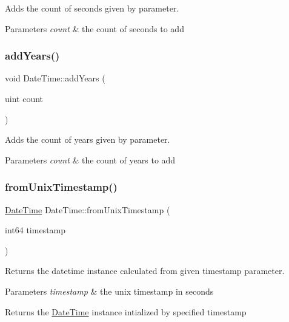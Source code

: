 Adds the count of seconds given by parameter. 


\begin{DoxyParams}{Parameters}
{\em count} & the count of seconds to add \\
\hline
\end{DoxyParams}
\mbox{\label{class_date_time_a831ab5e9d50c8157ee0c23dc292b8ef5}} 
\subsubsection{\texorpdfstring{addYears()}{addYears()}}
{\footnotesize\ttfamily void Date\+Time\+::add\+Years (\begin{DoxyParamCaption}\item[{uint}]{count }\end{DoxyParamCaption})}



Adds the count of years given by parameter. 


\begin{DoxyParams}{Parameters}
{\em count} & the count of years to add \\
\hline
\end{DoxyParams}
\mbox{\label{class_date_time_afdc41a37a33bc6c5643430494f959c1b}} 
\subsubsection{\texorpdfstring{fromUnixTimestamp()}{fromUnixTimestamp()}}
{\footnotesize\ttfamily \mbox{\hyperlink{class_date_time}{Date\+Time}} Date\+Time\+::from\+Unix\+Timestamp (\begin{DoxyParamCaption}\item[{int64}]{timestamp }\end{DoxyParamCaption})\hspace{0.3cm}{\ttfamily [static]}}



Returns the datetime instance calculated from given timestamp parameter. 


\begin{DoxyParams}{Parameters}
{\em timestamp} & the unix timestamp in seconds \\
\hline
\end{DoxyParams}
\begin{DoxyReturn}{Returns}
the \mbox{\hyperlink{class_date_time}{Date\+Time}} instance intialized by specified timestamp 
\end{DoxyReturn}
\mbox{\label{class_date_time_aee3108295b202fc4807984c25778c942}} 

